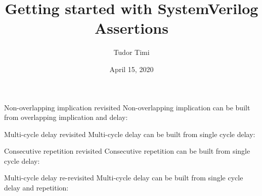 \documentclass{beamer}
\title{Getting started with SystemVerilog Assertions}
\author{Tudor Timi}
\institute{VerificationGentleman.com}
\date{April 15, 2020}
\begin{document}
\begin{frame}[fragile]{Non-overlapping implication revisited}
Non-overlapping implication can be built from overlapping implication and delay:

\pause
{}

\pause
{}

\pause
{}
\end{frame}


\begin{frame}[fragile]{Multi-cycle delay revisited}
Multi-cycle delay can be built from single cycle delay:

\pause
{}
\end{frame}


\begin{frame}[fragile]{Consecutive repetition revisited}
Consecutive repetition can be built from single cycle delay:

\pause
{}
\end{frame}


\begin{frame}[fragile]{Multi-cycle delay re-revisited}
Multi-cycle delay can be built from single cycle delay and repetition:

\pause
{}

\pause
{}
\end{frame}
\end{document}
